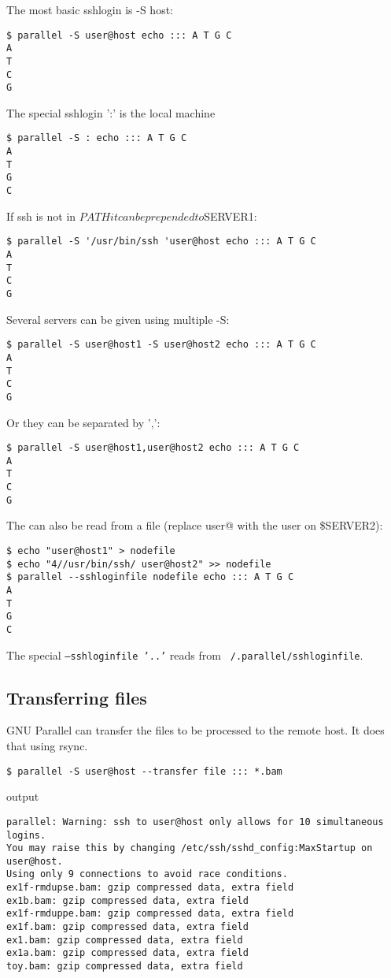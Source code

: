\documentclass{article}
\begin{document}
The most basic sshlogin is -S host:

\begin{lstlisting}
$ parallel -S user@host echo ::: A T G C
A
T
C
G
\end{lstlisting}
The special sshlogin ':' is the local machine
\begin{lstlisting}
$ parallel -S : echo ::: A T G C
A
T
G
C
\end{lstlisting}

If ssh is not in $PATH it can be prepended to $SERVER1:
\begin{lstlisting}
$ parallel -S '/usr/bin/ssh 'user@host echo ::: A T G C
A
T
C
G
\end{lstlisting}
Several servers can be given using multiple -S:
\begin{lstlisting}
$ parallel -S user@host1 -S user@host2 echo ::: A T G C
A
T
C
G
\end{lstlisting}
Or they can be separated by ',':
\begin{lstlisting}
$ parallel -S user@host1,user@host2 echo ::: A T G C
A
T
C
G
\end{lstlisting}

The can also be read from a file (replace user@ with the user on \$SERVER2):

\begin{lstlisting}
$ echo "user@host1" > nodefile
$ echo "4//usr/bin/ssh/ user@host2" >> nodefile 
$ parallel --sshloginfile nodefile echo ::: A T G C
A
T
G
C
\end{lstlisting}
The special \texttt{--sshloginfile '..'} reads from \texttt{~/.parallel/sshloginfile}.


\subsection{Transferring files}
GNU Parallel can transfer the files to be processed to the remote host. It does that using rsync.

\begin{lstlisting}
$ parallel -S user@host --transfer file ::: *.bam
\end{lstlisting}
output
\begin{lstlisting}
parallel: Warning: ssh to user@host only allows for 10 simultaneous logins.
You may raise this by changing /etc/ssh/sshd_config:MaxStartup on user@host.
Using only 9 connections to avoid race conditions.
ex1f-rmdupse.bam: gzip compressed data, extra field
ex1b.bam: gzip compressed data, extra field
ex1f-rmduppe.bam: gzip compressed data, extra field
ex1f.bam: gzip compressed data, extra field
ex1.bam: gzip compressed data, extra field
ex1a.bam: gzip compressed data, extra field
toy.bam: gzip compressed data, extra field
\end{lstlisting}
\end{document}
